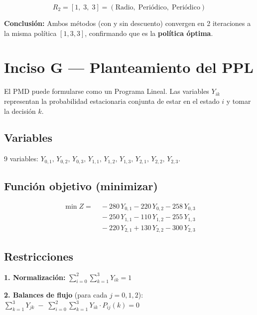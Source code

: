 \documentclass[12pt,a4paper]{article}
\begin{document}
\[
\boxed{ R_2 = [1,\; 3,\; 3] = (\text{Radio},\; \text{Periódico},\; \text{Periódico}) }
\]

\textbf{Conclusión:} Ambos métodos (con y sin descuento) convergen en 2 iteraciones a la misma política $[1,3,3]$, confirmando que es la \textbf{política óptima}.

\newpage

\section{Inciso G --- Planteamiento del PPL}

El PMD puede formularse como un Programa Lineal. Las variables $Y_{ik}$ representan la probabilidad estacionaria conjunta de estar en el estado $i$ y tomar la decisión $k$.

\subsection*{Variables}

9 variables: $Y_{0,1},\, Y_{0,2},\, Y_{0,3},\, Y_{1,1},\, Y_{1,2},\, Y_{1,3},\, Y_{2,1},\, Y_{2,2},\, Y_{2,3}$.

\subsection*{Función objetivo (minimizar)}

\[
\begin{aligned}
\min Z = &\; -280\,Y_{0,1} - 220\,Y_{0,2} - 258\,Y_{0,3} \\
         &\; -250\,Y_{1,1} - 110\,Y_{1,2} - 255\,Y_{1,3} \\
         &\; -220\,Y_{2,1} + 130\,Y_{2,2} - 300\,Y_{2,3}
\end{aligned}
\]

\subsection*{Restricciones}

\textbf{1. Normalización:}
$\displaystyle \sum_{i=0}^{2}\sum_{k=1}^{3} Y_{ik} = 1$

\vspace{4pt}
\textbf{2. Balances de flujo} (para cada $j = 0, 1, 2$):
$\displaystyle \sum_{k=1}^{3} Y_{jk} \;-\; \sum_{i=0}^{2}\sum_{k=1}^{3} Y_{ik} \cdot P_{ij}(k) = 0$
\end{document}
